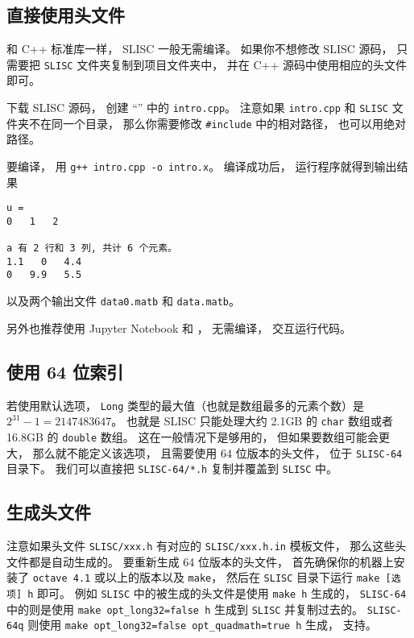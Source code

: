 
\begin{issues}
\issueDraft
\end{issues}


\subsection{直接使用头文件}
和 C++ 标准库一样， SLISC 一般无需编译。 如果你不想修改 SLISC 源码， 只需要把 \verb|SLISC| 文件夹复制到项目文件夹中， 并在 C++ 源码中使用相应的头文件即可。

下载 SLISC 源码， 创建 “” 中的 \verb|intro.cpp|。 注意如果 \verb|intro.cpp| 和 \verb|SLISC| 文件夹不在同一个目录， 那么你需要修改 \verb|#include| 中的相对路径， 也可以用绝对路径。

要编译， 用 \verb|g++ intro.cpp -o intro.x|。 编译成功后， 运行程序就得到输出结果
\begin{lstlisting}[language=none]
u = 
0   1   2   

a 有 2 行和 3 列, 共计 6 个元素。
1.1   0   4.4   
0   9.9   5.5
\end{lstlisting}
以及两个输出文件 \verb|data0.matb| 和 \verb|data.matb|。

另外也推荐使用 Jupyter Notebook 和 ， 无需编译， 交互运行代码。

\subsection{使用 64 位索引}
若使用默认选项， \verb|Long| 类型的最大值（也就是数组最多的元素个数）是 $2^{31}-1 = 2147483647$。 也就是 SLISC 只能处理大约 2.1GB 的 \verb|char| 数组或者 16.8GB 的 \verb|double| 数组。 这在一般情况下是够用的， 但如果要数组可能会更大， 那么就不能定义该选项， 且需要使用 64 位版本的头文件， 位于 \verb|SLISC-64| 目录下。 我们可以直接把 \verb|SLISC-64/*.h| 复制并覆盖到 \verb|SLISC| 中。

\subsection{生成头文件}

注意如果头文件 \verb|SLISC/xxx.h| 有对应的 \verb|SLISC/xxx.h.in| 模板文件， 那么这些头文件都是自动生成的。 要重新生成 64 位版本的头文件， 首先确保你的机器上安装了 \verb|octave 4.1| 或以上的版本以及 \verb|make|， 然后在 \verb|SLISC| 目录下运行 \verb|make [选项] h| 即可。 例如 \verb|SLISC| 中的被生成的头文件是使用 \verb|make h| 生成的， \verb|SLISC-64| 中的则是使用 \verb|make opt_long32=false h| 生成到 \verb|SLISC| 并复制过去的。 \verb|SLISC-64q| 则使用 \verb|make opt_long32=false opt_quadmath=true h| 生成， 支持。

